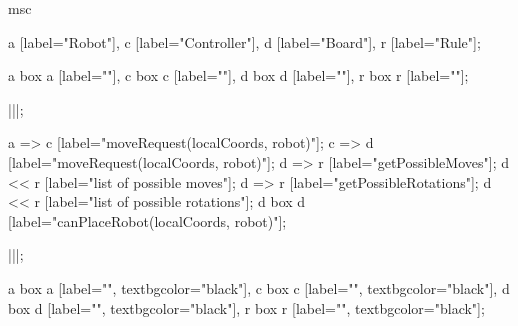 \begin{msc}
msc
{

a [label="Robot"],
c [label="Controller"],
d [label="Board"],
r [label="Rule"];

a box a [label=""],
c box c [label=""],
d box d [label=""],
r box r [label=""];

|||;

a => c [label="moveRequest(localCoords, robot)"];
c => d [label="moveRequest(localCoords, robot)"];
d => r [label="getPossibleMoves"];
d << r [label="list of possible moves"];
d => r [label="getPossibleRotations"];
d << r [label="list of possible rotations"];
d box d [label="canPlaceRobot(localCoords, robot)"];

|||;

a box a [label="", textbgcolor="black"],
c box c [label="", textbgcolor="black"],
d box d [label="", textbgcolor="black"],
r box r [label="", textbgcolor="black"];

}
\end{msc}
